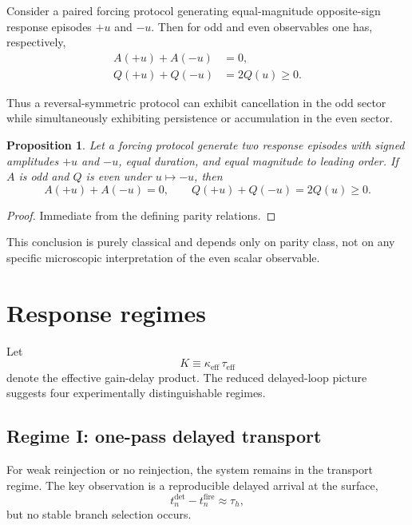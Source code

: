 \documentclass[11pt,a4paper]{article}
\newtheorem{proposition}{Proposition}
\begin{document}
Consider a paired forcing protocol generating equal-magnitude opposite-sign response episodes $+u$ and $-u$. Then for odd and even observables one has, respectively,
\begin{align}
A(+u)+A(-u) &= 0,
\label{eq:odd_cancel}
\\
Q(+u)+Q(-u) &= 2Q(u)\ge 0.
\label{eq:even_survive}
\end{align}

Thus a reversal-symmetric protocol can exhibit cancellation in the odd sector while simultaneously exhibiting persistence or accumulation in the even sector.

\begin{proposition}
Let a forcing protocol generate two response episodes with signed amplitudes $+u$ and $-u$, equal duration, and equal magnitude to leading order. If $A$ is odd and $Q$ is even under $u\mapsto -u$, then
\begin{equation}
A(+u)+A(-u)=0,
\qquad
Q(+u)+Q(-u)=2Q(u)\ge 0.
\end{equation}
\end{proposition}

\begin{proof}
Immediate from the defining parity relations.
\end{proof}

This conclusion is purely classical and depends only on parity class, not on any specific microscopic interpretation of the even scalar observable.

\section{Response regimes}

Let
\begin{equation}
K \equiv \kappa_{\mathrm{eff}}\,\tau_{\mathrm{eff}}
\label{eq:Kdef}
\end{equation}
denote the effective gain-delay product. The reduced delayed-loop picture suggests four experimentally distinguishable regimes.

\subsection{Regime I: one-pass delayed transport}

For weak reinjection or no reinjection, the system remains in the transport regime. The key observation is a reproducible delayed arrival at the surface,
\begin{equation}
t_n^{\mathrm{det}} - t_n^{\mathrm{fire}} \approx \tau_h,
\end{equation}
but no stable branch selection occurs.
\end{document}
